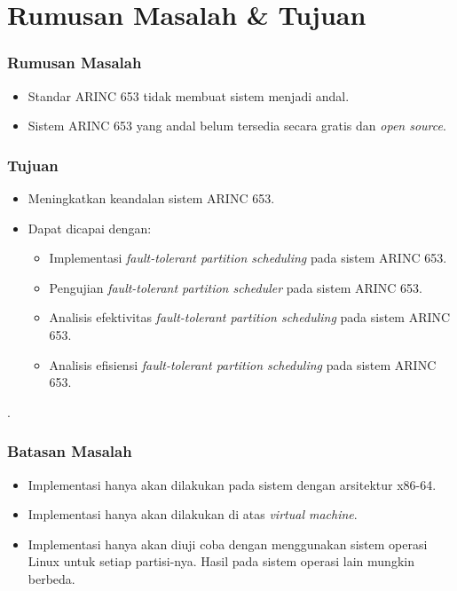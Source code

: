 \documentclass[xetex]{beamer}
\begin{document}
\section{Rumusan Masalah \& Tujuan}
\begin{frame}
	\frametitle{Rumusan Masalah}
	\begin{itemize}
		\item Standar ARINC 653 tidak membuat sistem menjadi andal.
		\item Sistem ARINC 653 yang andal belum tersedia secara gratis dan \textit{open source}.
	\end{itemize}
\end{frame}
\begin{frame}
	\frametitle{Tujuan}
	\begin{itemize}
		\item Meningkatkan keandalan sistem ARINC 653.
		\item Dapat dicapai dengan:
			\begin{itemize}
				\item Implementasi \textit{fault-tolerant partition scheduling} pada sistem ARINC 653.
				\item Pengujian \textit{fault-tolerant partition scheduler} pada sistem ARINC 653.
				\item Analisis efektivitas \textit{fault-tolerant partition scheduling} pada sistem ARINC 653.
				\item Analisis efisiensi \textit{fault-tolerant partition scheduling} pada sistem ARINC 653.
			\end{itemize}
	\end{itemize}.
\end{frame}
\begin{frame}
	\frametitle{Batasan Masalah}
	\begin{itemize}
		\item Implementasi hanya akan dilakukan pada sistem dengan arsitektur x86-64.
		\item Implementasi hanya akan dilakukan di atas \textit{virtual machine}.
		\item Implementasi hanya akan diuji coba dengan menggunakan sistem operasi Linux untuk setiap partisi-nya.
			Hasil pada sistem operasi lain mungkin berbeda.
	\end{itemize}
\end{frame}
\end{document}
